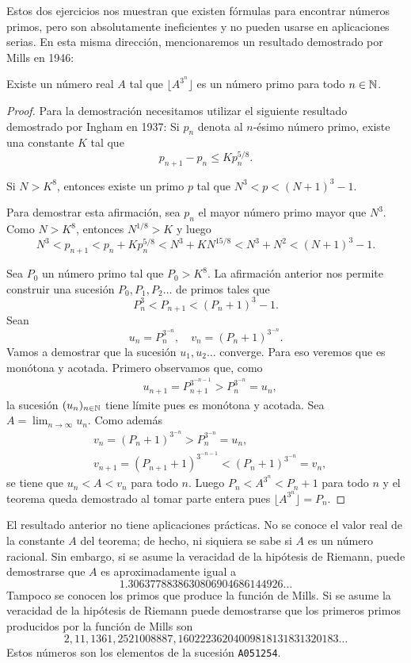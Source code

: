 Estos dos ejercicios nos muestran que existen fórmulas para encontrar números
primos, pero son absolutamente ineficientes y no pueden usarse en aplicaciones
serias. En esta misma dirección, mencionaremos un resultado demostrado por
Mills en 1946:

\begin{theorem}[Mills]
	Existe un número real $A$ tal que $\lfloor A^{3^n}\rfloor$ es un número
	primo para todo $n\in\mathbb{N}$.	
\end{theorem}

\begin{proof}
	Para la demostración necesitamos utilizar el siguiente resultado demostrado
	por Ingham en 1937: Si $p_n$ denota al $n$-ésimo número primo, existe una
	constante $K$ tal que 
	\[
		p_{n+1}-p_n\leq Kp_n^{5/8}.
	\]

	\begin{claim}
		Si $N>K^8$, entonces existe un primo $p$ tal que $N^3<p<(N+1)^3-1$. 
	\end{claim}

	Para demostrar esta afirmación, sea $p_n$ el mayor número primo mayor que
	$N^3$. Como $N>K^8$, entonces $N^{1/8}>K$ y luego
	\[
		N^3<p_{n+1}<p_n+Kp_n^{5/8}<N^3+KN^{15/8}<N^3+N^2<(N+1)^3-1.
	\]

	Sea $P_0$ un número primo tal que $P_0>K^8$. La afirmación anterior nos
	permite construir una sucesión $P_0,P_1,P_2\dots$ de primos tales que
	\[
		P_n^3<P_{n+1}<(P_n+1)^3-1.
	\]
	Sean 
	\[
		u_n=P_n^{3^{-n}},\quad
		v_n=(P_n+1)^{3^{-n}}.
	\]
	Vamos a demostrar que la sucesión $u_1,u_2\dots$ converge. Para eso veremos que es monótona y acotada. 
	Primero observamos que, como 
	\begin{align*}
		&u_{n+1}=P_{n+1}^{3^{-n-1}}>P_n^{3^{-n}}=u_n,
	\end{align*}
	la sucesión $(u_n)_{n\in\mathbb{N}}$ tiene límite pues es monótona y acotada. 
	Sea $A=\lim_{n\to\infty}u_n$. Como además 
	\begin{align*}
		&v_n=(P_n+1)^{3^{-n}}>P_n^{3^{-n}}=u_n,\\
		&v_{n+1}=(P_{n+1}+1)^{3^{-n-1}}<(P_n+1)^{3^{-n}}=v_n,
	\end{align*}
	se tiene que
	$u_n<A<v_n$ para todo $n$. Luego $P_n<A^{3^n}<P_n+1$ para todo $n$ y el
	teorema queda demostrado al tomar parte entera pues $\lfloor
	A^{3^n}\rfloor=P_n$. 
\end{proof}

El resultado anterior no tiene aplicaciones prácticas. No se conoce el valor
real de la constante $A$ del teorema; de hecho, ni siquiera se sabe si $A$ es
un número racional. Sin embargo, si se asume la veracidad de la hipótesis de
Riemann, puede demostrarse que $A$ es aproximadamente igual a
\[
	1.3063778838630806904686144926\dots
\]
Tampoco se conocen los primos que produce la función de Mills. Si se asume la
veracidad de la hipótesis de Riemann puede demostrarse que los primeros primos
producidos por la función de Mills son
\[
    2,11,1361,2521008887, 16022236204009818131831320183\dots
\]
Estos números son los elementos de la sucesión \verb+A051254+.  

